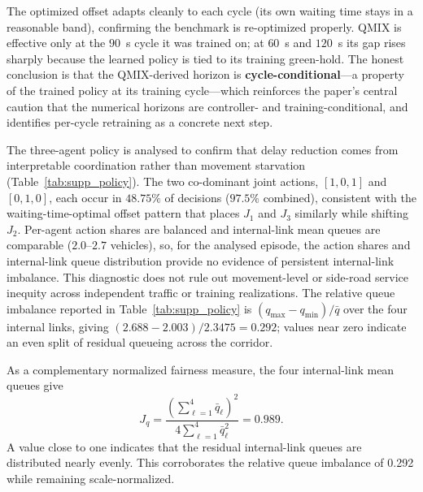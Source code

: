 \documentclass[12pt]{article}
\newcommand{\suppsec}[1]{%
  \bigskip\par\noindent{\large\bfseries #1}\par\medskip}
\begin{document}
The optimized offset adapts cleanly to each cycle (its own waiting time stays in a
reasonable band), confirming the benchmark is re-optimized properly. QMIX is effective
only at the $90$~s cycle it was trained on; at $60$~s and $120$~s its gap rises sharply
because the learned policy is tied to its training green-hold. The honest conclusion is
that the QMIX-derived horizon is \textbf{cycle-conditional}---a property of the trained
policy at its training cycle---which reinforces the paper's central caution that the
numerical horizons are controller- and training-conditional, and identifies per-cycle
retraining as a concrete next step.

\suppsec{S-4\quad Policy behaviour and fairness ($N=3$)}

The three-agent policy is analysed to confirm that delay reduction comes from
interpretable coordination rather than movement starvation
(Table~\ref{tab:supp_policy}). The two co-dominant joint actions, $[1,0,1]$ and $[0,1,0]$, each occur in
$48.75\%$ of decisions ($97.5\%$ combined), consistent with the waiting-time-optimal
offset pattern that places $J_1$ and $J_3$ similarly while shifting $J_2$. Per-agent
action shares are balanced and internal-link mean queues are comparable
($2.0$--$2.7$ vehicles), so, for the analysed episode, the action shares and
internal-link queue distribution provide no evidence of persistent internal-link
imbalance. This diagnostic does not rule out movement-level or side-road service
inequity across independent traffic or training realizations. The relative queue imbalance reported in
Table~\ref{tab:supp_policy} is
$(q_{\max}-q_{\min})/\bar{q}$ over the four internal links, giving
$(2.688-2.003)/2.3475=0.292$; values near zero indicate an even split of
residual queueing across the corridor.

As a complementary normalized fairness measure, the four internal-link mean queues give
\[
J_q=
\frac{\left(\sum_{\ell=1}^{4}\bar q_\ell\right)^2}
{4\sum_{\ell=1}^{4}\bar q_\ell^2}
=0.989.
\]
A value close to one indicates that the residual internal-link queues are distributed nearly evenly. This corroborates the relative queue imbalance of 0.292 while remaining scale-normalized.
\end{document}
